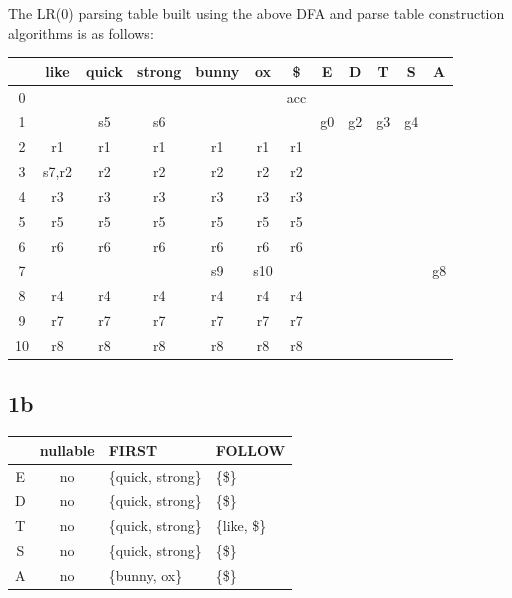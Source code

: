 \documentclass{article}
\begin{document}
    The LR(0) parsing table built using the above DFA and parse table construction algorithms is as follows:
    \begin{center}
        \begin{tabular}{ c c c c c c c | c c c c c }
            \hline
            & like & quick & strong & bunny & ox & \$ & E & D & T & S & A \\
            \hline
            0 & & & & & & acc & \\
            1 & & s5 & s6 & & & & g0 & g2 & g3 & g4 & \\
            2 & r1 & r1 & r1 & r1 & r1 & r1 & \\
            3 & s7,r2 & r2 & r2 & r2 & r2 & r2 & \\
            4 & r3 & r3 & r3 & r3 & r3 & r3 & \\
            5 & r5 & r5 & r5 & r5 & r5 & r5 & \\
            6 & r6 & r6 & r6 & r6 & r6 & r6 & \\
            7 & & & & s9 & s10 & & & & & & g8 \\
            8 & r4 & r4 & r4 & r4 & r4 & r4 & \\
            9 & r7 & r7 & r7 & r7 & r7 & r7 & \\
            10 & r8 & r8 & r8 & r8 & r8 & r8 & \\
        \end{tabular}
    \end{center}
    
    \subsection*{1b}
    \begin{center}
        \begin{tabular}{ c c l l }
            \hline
            & nullable & FIRST & FOLLOW \\
            \hline
            E & no & \{quick, strong\} & \{\$\} \\
            D & no & \{quick, strong\} & \{\$\} \\
            T & no & \{quick, strong\} & \{like, \$\} \\
            S & no & \{quick, strong\} & \{\$\} \\
            A & no & \{bunny, ox\} & \{\$\} \\
        \end{tabular}
    \end{center}
    
\end{document}

